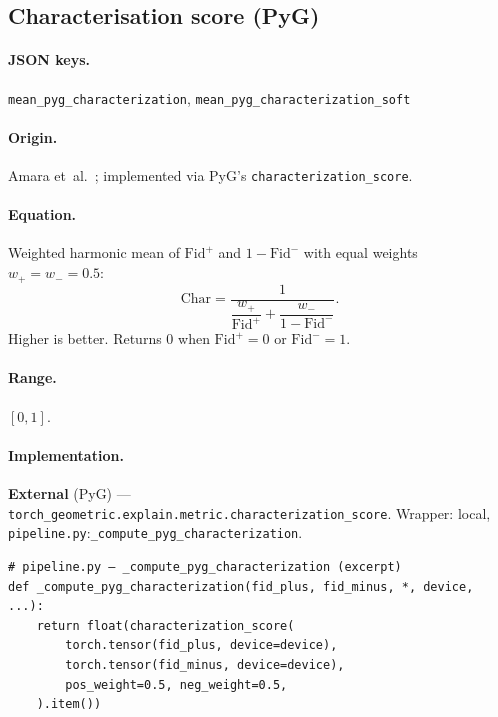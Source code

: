 \documentclass[11pt,a4paper]{article}
\newcommand{\code}[1]{\texttt{#1}}
\newcommand{\jsonkey}[1]{\texttt{#1}}
\begin{document}
\subsection{Characterisation score (PyG)}
\label{sec:pygchar}

\paragraph{JSON keys.} \jsonkey{mean\_pyg\_characterization},
\jsonkey{mean\_pyg\_characterization\_soft}

\paragraph{Origin.} Amara et~al.~\cite{amara2022graphframex}; implemented
via PyG's \code{characterization\_score}.

\paragraph{Equation.}
Weighted harmonic mean of $\mathrm{Fid}^+$ and $1 - \mathrm{Fid}^-$
with equal weights $w_+ = w_- = 0.5$:
\begin{equation}
  \mathrm{Char} = \frac{1}
    {\dfrac{w_+}{\mathrm{Fid}^+} + \dfrac{w_-}{1 - \mathrm{Fid}^-}}.
  \label{eq:char}
\end{equation}
Higher is better.  Returns $0$ when $\mathrm{Fid}^+ = 0$ or
$\mathrm{Fid}^- = 1$.

\paragraph{Range.} $[0, 1]$.

\paragraph{Implementation.} \textbf{External} (PyG) —
\code{torch\_geometric.explain.metric.characterization\_score}.  Wrapper:
local, \code{pipeline.py}:\code{\_compute\_pyg\_characterization}.

\begin{verbatim}
# pipeline.py — _compute_pyg_characterization (excerpt)
def _compute_pyg_characterization(fid_plus, fid_minus, *, device, ...):
    return float(characterization_score(
        torch.tensor(fid_plus, device=device),
        torch.tensor(fid_minus, device=device),
        pos_weight=0.5, neg_weight=0.5,
    ).item())
\end{verbatim}
\end{document}
